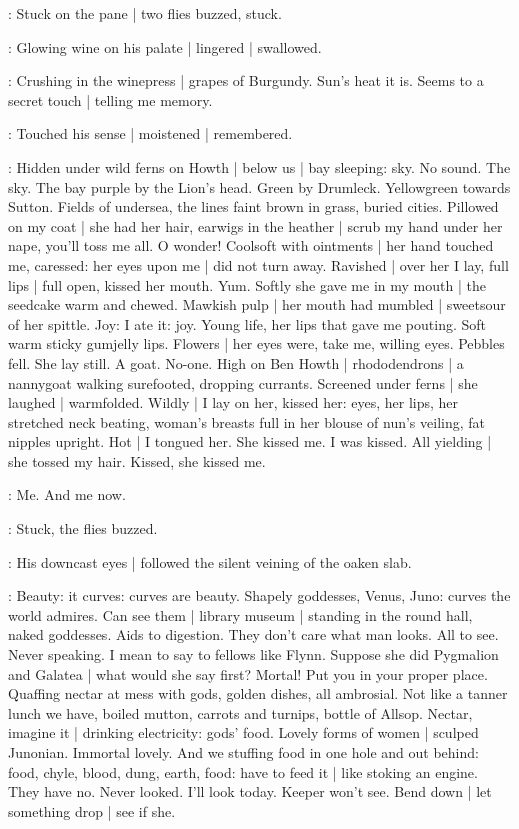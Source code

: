 :
Stuck on the pane |
two flies buzzed,
stuck.

:
Glowing wine on his palate |
lingered |
swallowed.

\BloomInt:
Crushing in the winepress |
grapes of Burgundy.
Sun's heat it is.
Seems to a secret touch |
telling me memory.

:
Touched his sense |
moistened |
remembered.

\BloomInt:
Hidden under wild ferns on Howth |
below us |
bay sleeping:
sky.
No sound.
The sky.
The bay purple by the Lion's head.
Green by Drumleck.
Yellowgreen towards Sutton.
Fields of undersea,
the lines faint brown in grass,
buried cities.
Pillowed on my coat |
she had her hair,
earwigs in the heather |
scrub my hand under her nape,
you'll toss me all.
O wonder!
Coolsoft with ointments |
her hand touched me,
caressed:
her eyes upon me |
did not turn away.
Ravished |
over her I lay,
full lips |
full open,
kissed her mouth.
Yum.
Softly she gave me in my mouth |
the seedcake warm and chewed.
Mawkish pulp |
her mouth had mumbled |
sweetsour of her spittle.
Joy:
I ate it:
joy.
Young life,
her lips that gave me pouting.
Soft warm sticky gumjelly lips.
Flowers |
her eyes were,
take me,
willing eyes.
Pebbles fell.
She lay still.
A goat.
No-one.
High on Ben Howth |
rhododendrons |
a nannygoat walking surefooted, dropping currants.
Screened under ferns |
she laughed |
warmfolded.
Wildly |
I lay on her,
kissed her:
eyes, her lips,
her stretched neck beating,
woman's breasts full in her blouse of nun's veiling,
fat nipples upright.
Hot |
I tongued her.
She kissed me.
I was kissed.
All yielding |
she tossed
my hair.
Kissed, she kissed me.

\BloomInt:
Me.
And me now.

:
Stuck,
the flies buzzed.

:
His downcast eyes |
followed the silent veining of the oaken slab.

\BloomInt:
Beauty:
it curves:
curves are beauty.
Shapely goddesses,
Venus, Juno:
curves the world admires.
Can see them |
library museum |
standing in the round hall,
naked goddesses.
Aids to digestion.
They don't care what man looks.
All to see.
Never speaking.
I mean to say to fellows like Flynn.
Suppose she did Pygmalion and Galatea |
what would she say first?
Mortal!
Put you in your proper place.
Quaffing nectar at mess with gods,
golden dishes,
all ambrosial.
Not like a tanner lunch we have,
boiled mutton,
carrots and turnips,
bottle of Allsop.
Nectar, imagine it |
drinking electricity:
gods' food.
Lovely forms of women |
sculped Junonian.
Immortal lovely.
And we stuffing food in one hole and out behind:
food, chyle, blood, dung, earth, food:
have to feed it |
like stoking an engine.
They have no.
Never looked.
I'll look today.
Keeper won't see.
Bend down |
let something drop |
see if she.

